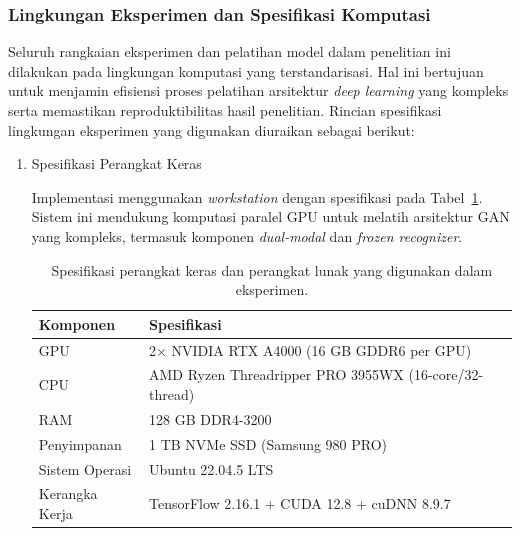 \documentclass[12pt,a4paper]{article}
\begin{document}
\subsubsection{Lingkungan Eksperimen dan Spesifikasi Komputasi}
\label{subsec:lingkungan-eksperimen}

Seluruh rangkaian eksperimen dan pelatihan model dalam penelitian ini dilakukan pada lingkungan komputasi yang terstandarisasi. Hal ini bertujuan untuk menjamin efisiensi proses pelatihan arsitektur \textit{deep learning} yang kompleks serta memastikan reproduktibilitas hasil penelitian. Rincian spesifikasi lingkungan eksperimen yang digunakan diuraikan sebagai berikut:

\begin{enumerate}[label=\arabic*., leftmargin=*, wide=0pt, itemsep=1em]
    \item Spesifikasi Perangkat Keras

Implementasi menggunakan \textit{workstation} dengan spesifikasi pada Tabel~\ref{tab:hardware-specs-actual}. Sistem ini mendukung komputasi paralel GPU untuk melatih arsitektur GAN yang kompleks, termasuk komponen \textit{dual-modal} dan \textit{frozen recognizer}.

\begin{table}[H]
  \caption[Lingkungan eksperimen]{Spesifikasi perangkat keras dan perangkat lunak yang digunakan dalam eksperimen.}
  \label{tab:hardware-specs-actual}
  \normalsize
  \centering
  \begin{tabular}{|l|l|}
    \hline
    \textbf{Komponen} & \textbf{Spesifikasi}                                  \\
    \hline
    GPU               & 2$\times$ NVIDIA RTX A4000 (16 GB GDDR6 per GPU)      \\
    \hline
    CPU               & AMD Ryzen Threadripper PRO 3955WX (16-core/32-thread) \\
    \hline
    RAM               & 128 GB DDR4-3200                                      \\
    \hline
    Penyimpanan       & 1 TB NVMe SSD (Samsung 980 PRO)                       \\
    \hline
    Sistem Operasi    & Ubuntu 22.04.5 LTS                                    \\
    \hline
    Kerangka Kerja    & TensorFlow 2.16.1 + CUDA 12.8 + cuDNN 8.9.7           \\
    \hline
  \end{tabular}
\end{table}



\end{enumerate}
\end{document}
